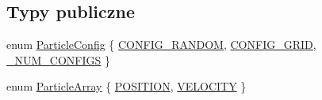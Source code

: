 \subsection*{Typy publiczne}
\begin{DoxyCompactItemize}
\item 
enum \hyperlink{class_particle_system_a1dca3996c8068602412ef9f7826605d1}{Particle\-Config} \{ \hyperlink{class_particle_system_a1dca3996c8068602412ef9f7826605d1a053c69e4e6b094605ea152a644e7c9ee}{C\-O\-N\-F\-I\-G\-\_\-\-R\-A\-N\-D\-O\-M}, 
\hyperlink{class_particle_system_a1dca3996c8068602412ef9f7826605d1aa6bd9e92edfc102877bf103547397b47}{C\-O\-N\-F\-I\-G\-\_\-\-G\-R\-I\-D}, 
\hyperlink{class_particle_system_a1dca3996c8068602412ef9f7826605d1a602c3604196d8513e85acf6fd039391e}{\-\_\-\-N\-U\-M\-\_\-\-C\-O\-N\-F\-I\-G\-S}
 \}
\item 
enum \hyperlink{class_particle_system_a332fbe57a36aaea5c18b4ea4fba6bbb3}{Particle\-Array} \{ \hyperlink{class_particle_system_a332fbe57a36aaea5c18b4ea4fba6bbb3a9e9a2992d230a2674debf26e0e8e0299}{P\-O\-S\-I\-T\-I\-O\-N}, 
\hyperlink{class_particle_system_a332fbe57a36aaea5c18b4ea4fba6bbb3a3702de73065f01b4f6ffa604b799e53d}{V\-E\-L\-O\-C\-I\-T\-Y}
 \}
\end{DoxyCompactItemize}
